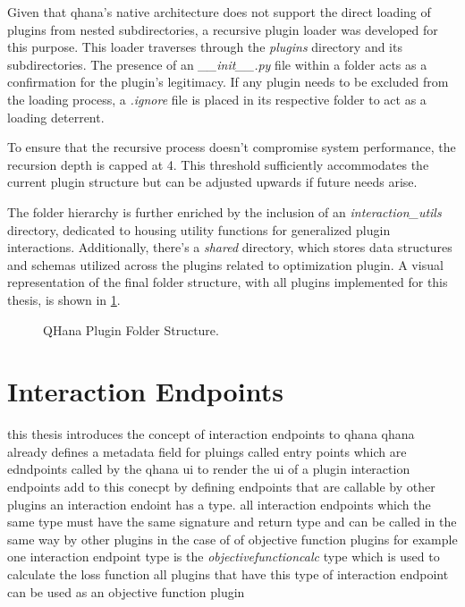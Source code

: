 \documentclass[
  a4paper,  %
  twoside,  %
  bibliography=totoc,
  headsepline,
  cleardoublepage=empty,
  parskip=half,
  draft=false
]{scrbook}
\begin{document}
Given that \gls{qhana}'s native architecture does not support the direct loading of plugins from nested subdirectories, a recursive plugin loader was developed for this purpose.
This loader traverses through the \textit{plugins} directory and its subdirectories.
The presence of an \textit{\_\_init\_\_.py} file within a folder acts as a confirmation for the plugin's legitimacy.
If any plugin needs to be excluded from the loading process, a \textit{.ignore} file is placed in its respective folder to act as a loading deterrent.

To ensure that the recursive process doesn’t compromise system performance, the recursion depth is capped at 4.
This threshold sufficiently accommodates the current plugin structure but can be adjusted upwards if future needs arise.

The folder hierarchy is further enriched by the inclusion of an \textit{interaction\_utils} directory, dedicated to housing utility functions for generalized plugin interactions.
Additionally, there's a \textit{shared} directory, which stores data structures and schemas utilized across the plugins related to optimization plugin.
A visual representation of the final folder structure, with all plugins implemented for this thesis, is shown in \cref{fig:folderStructure}.


\begin{figure}[h!]
  \caption{QHana Plugin Folder Structure.}
  \label{fig:folderStructure}
\end{figure}


\section{Interaction Endpoints}
\label{sec:interactionEndpoints}
this thesis introduces the concept of interaction endpoints to \gls{qhana}
qhana already defines a metadata field for pluings called entry points which are edndpoints called by the qhana ui to render the ui of a plugin
interaction endpoints add to this conecpt by defining endpoints that are callable by other plugins
an interaction endoint has a type.
all interaction endpoints which the same type must have the same signature and return type and can be called in the same way by other plugins
in the case of of objective function plugins for example one interaction endpoint type is the \emph{objectivefunctioncalc} type which is used to calculate the loss function
all plugins that have this type of interaction endpoint can be used as an objective function plugin
\end{document}
